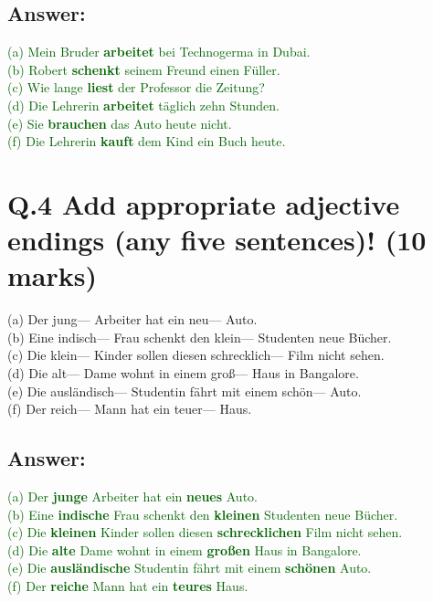 \documentclass[a4paper,12pt]{article}
\begin{document}
\subsection*{Answer:}
\textcolor{darkgreen}{(a) Mein Bruder \textbf{arbeitet} bei Technogerma in Dubai.\\}
\textcolor{darkgreen}{(b) Robert \textbf{schenkt} seinem Freund einen Füller.\\}
\textcolor{darkgreen}{(c) Wie lange \textbf{liest} der Professor die Zeitung?\\}
\textcolor{darkgreen}{(d) Die Lehrerin \textbf{arbeitet} täglich zehn Stunden.\\}
\textcolor{darkgreen}{(e) Sie \textbf{brauchen} das Auto heute nicht.\\}
\textcolor{darkgreen}{(f) Die Lehrerin \textbf{kauft} dem Kind ein Buch heute.\\}

\vspace{1cm}

\section*{Q.4 Add appropriate adjective endings (any five sentences)! (10 marks)}

(a) Der jung--- Arbeiter hat ein neu--- Auto.\\
(b) Eine indisch--- Frau schenkt den klein--- Studenten neue Bücher.\\
(c) Die klein--- Kinder sollen diesen schrecklich--- Film nicht sehen.\\
(d) Die alt--- Dame wohnt in einem groß--- Haus in Bangalore.\\
(e) Die ausländisch--- Studentin fährt mit einem schön--- Auto.\\
(f) Der reich--- Mann hat ein teuer--- Haus.

\subsection*{Answer:}
\textcolor{darkgreen}{(a) Der \textbf{junge} Arbeiter hat ein \textbf{neues} Auto.\\}
\textcolor{darkgreen}{(b) Eine \textbf{indische} Frau schenkt den \textbf{kleinen} Studenten neue Bücher.\\}
\textcolor{darkgreen}{(c) Die \textbf{kleinen} Kinder sollen diesen \textbf{schrecklichen} Film nicht sehen.\\}
\textcolor{darkgreen}{(d) Die \textbf{alte} Dame wohnt in einem \textbf{großen} Haus in Bangalore.\\}
\textcolor{darkgreen}{(e) Die \textbf{ausländische} Studentin fährt mit einem \textbf{schönen} Auto.\\}
\textcolor{darkgreen}{(f) Der \textbf{reiche} Mann hat ein \textbf{teures} Haus.\\}
\end{document}
